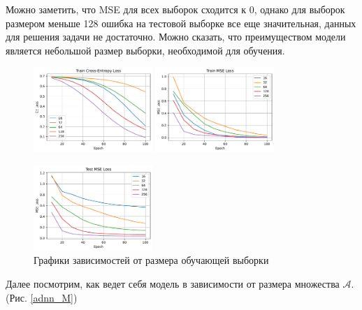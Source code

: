 \documentclass[12pt]{article}
\begin{document}
Можно заметить, что MSE для всех выборок сходится к 0, однако для выборок размером меньше 128 ошибка на тестовой выборке все еще значительная, данных для решения задачи не достаточно. Можно сказать, что преимуществом модели является небольшой размер выборки, необходимой для обучения.

\begin{figure}
    \centering
    \includegraphics[width=0.4\textwidth]{adnn_train_size_epoch_train_loss.pdf}
    \quad
    \includegraphics[width=0.4\textwidth]{adnn_train_size_epoch_train_mse.pdf}
    
    \includegraphics[width=0.4\textwidth]{adnn_train_size_epoch_test_mse.pdf}
    \caption{Графики зависимостей от размера обучающей выборки}
    \label{adnn_train_size}
\end{figure}

Далее посмотрим, как ведет себя модель в зависимости от размера множества $\mathcal{A}$. (Рис. \ref{adnn_M})
\end{document}
